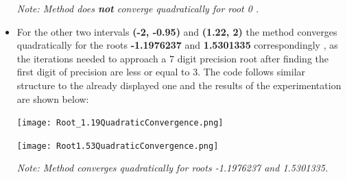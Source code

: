 \documentclass{article}
\begin{document}
\begin{itemize}
\begin{tcolorbox}[colback=gray!10, colframe=gray!80, width=\textwidth, sharp corners]
    \vspace{0.5cm} 
    
    \small\textit{Note: Method does \textbf{not} converge quadratically for root 0 .}
\end{tcolorbox}

    \item For the other two intervals \textbf{(-2, -0.95)} and \textbf{(1.22, 2)} the method converges quadratically for the roots \textbf{-1.1976237 }and\textbf{ 1.5301335} correspondingly , as the iterations needed to approach a 7 digit precision root after finding the first digit of precision are less or equal to 3. The code follows similar structure to the already displayed one and the  results of the experimentation are shown below:

    \begin{tcolorbox}[colback=gray!10, colframe=gray!80, sharp corners]
    \centering
    \begin{minipage}[t]{0.48\textwidth}
        \centering
        \texttt{[image: Root\_1.19QuadraticConvergence.png]}
    \end{minipage}
    \hfill
    \begin{minipage}[t]{0.48\textwidth}
        \centering
        \texttt{[image: Root1.53QuadraticConvergence.png]}
    \end{minipage}

    \vspace{0.5cm}
    
    \small\textit{Note: Method converges quadratically for roots -1.1976237 and 1.5301335.}
\end{tcolorbox}

\end{itemize}
\end{document}
